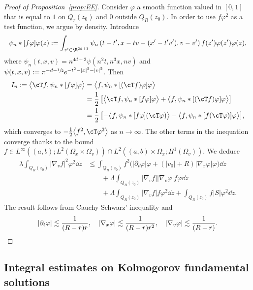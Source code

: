 \begin{proof}[Proof of Proposition~\ref{prop:EE}]
Consider $\varphi$ a smooth function valued in $[0,1]$ that is
equal to $1$ on $Q_r(z_0)$ and $0$ outside $Q_R(z_0)$. In order
to use $f\varphi^2$ as a test function, we argue by
density. Introduce
\begin{equation*}
\psi_n * [f \varphi] \varphi (z) :=
\int_{z'\in\R^{2d+1}} \psi_n \left(t-t',x-tv-(x'-t'v'),v-v'
\right) f(z') \varphi(z') \varphi(z),
\end{equation*}
where $\psi_n(t,x,v)=n^{4d+2} \psi(n^2 t,n^3 x, n v)$ and
$\psi(t,x,v):= \pi^{-d-\sfrac{1}{2}} e^{-t^2-|x|^2-|v|^2}$.
Then
\begin{align*}
I_n:= \big\langle \cT f, \psi_n * [f \varphi] \varphi
\big\rangle
& = \big\langle f, \psi_n * [(\cT f) \varphi] \varphi
\big\rangle \\
& = \frac{1}{2} \left[\big\langle \cT f, \psi_n * [f \varphi] \varphi
\big\rangle + \big\langle f, \psi_n * [(\cT f) \varphi] \varphi
\big\rangle \right] \\
& = \frac{1}{2}\, \bigl[-\big\langle f, \psi_n * [f \varphi] (\cT\varphi)
\big\rangle -\big\langle f, \psi_n * [f (\cT \varphi)] \varphi
\big\rangle \bigr],
\end{align*}
which converges to
$-\frac{1}{2} \big\langle f^2, \cT\varphi^2 \big\rangle$ as $n
\to \infty$. The
other terms in the inequation converge thanks to the bound
$f \in L^\infty ((a,b);L^2 (\Omega_x \times \Omega_v)) \cap L^2
((a,b) \times \Omega_x;H^1(\Omega_v))$. We deduce
\begin{align*}
\lambda \int_{Q_R(z_0)} |\nabla_v f|^2
\varphi^2 \dd z
& \le \int_{Q_R(z_0)} f^2 \Big( |\partial_t \varphi|
\varphi + (|v_0|+R) | \nabla_x \varphi| \varphi \Big) \dd z\\
& \qquad + \Lambda \int_{Q_R(z_0)} |\nabla_v
f| |\nabla_v \varphi| f \varphi \dd z \\
& \qquad + \Lambda
\int_{Q_R(z_0)} |\nabla_v f| f \varphi^2 \dd z +
\int_{Q_R(z_0)} f |S| \varphi^2 \dd z.
\end{align*}
The result follows from Cauchy-Schwarz' inequality
and
\[
|\partial_t \varphi| \lesssim \frac{1}{(R-r)r},\quad
|\nabla_x \varphi| \lesssim \frac{1}{(R-r)r^2},\quad
|\nabla_v \varphi| \lesssim \frac{1}{(R-r)}.\qedhere
\]
\end{proof}

\subsection{Integral estimates on Kolmogorov fundamental
solutions}

